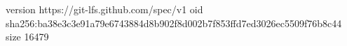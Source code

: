 version https://git-lfs.github.com/spec/v1
oid sha256:ba38e3c3e91a79e6743884d8b902f8d002b7f853ffd7ed3026ec5509f76b8c44
size 16479
